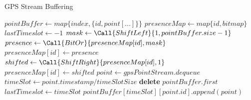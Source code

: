 \begin{algorithm}
\caption{GPS Stream Buffering}
\label{alg:gpsb}
\begin{algorithmic}[1]
    \State $pointBuffer \gets map\{index, \{id, point[...]\}\}$
    \State $presenceMap \gets map\{id, bitmap\}$
    \State $lastTimeslot \gets -1$
    \State
        \State $mask \gets \Call{ShiftLeft}{1, pointBuffer.size - 1}$
        \State $presence \gets \Call{BitOr}{presenceMap[id], mask}$
        \State $presenceMap[id] \gets presence$
    \EndProcedure
    \State
            \State $shifted \gets \Call{ShiftRight}{presenceMap[id], 1}$
            \State $presenceMap[id] \gets shifted$
        \EndFor
    \EndProcedure
    \State
        \Loop
            \State $point \gets gpsPointStream.dequeue$
            \State $timeSlot \gets point.timestamp / timeSlotSize$
                    \State {}
                    \State \textbf{delete} $pointBuffer.first$
                    \State {}
                \EndIf
                \State $lastTimeslot \gets timeSlot$
            \EndIf
            \State $pointBuffer[timeSlot][point.id].append(point)$
            \State {}
        \EndLoop
    \EndProcedure
\end{algorithmic}
\end{algorithm}

